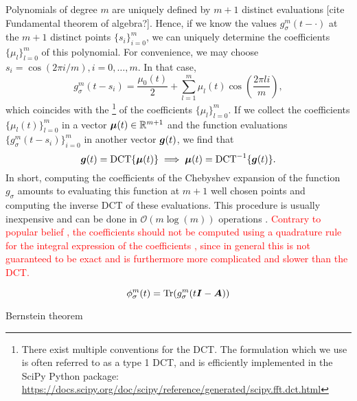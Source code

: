 Polynomials of degree $m$ are uniquely defined by $m+1$ distinct evaluations [cite Fundamental theorem of algebra?].
Hence, if we know the values $g_{\sigma}^m(t - \cdot)$ at the $m+1$ distinct points 
$\{s_i\}_{i=0}^m$, we can uniquely determine the coefficients $\{\mu_l\}_{l=0}^m$
of this polynomial. For convenience, we may choose $s_i = \cos(2 \pi i/m), i=0,\dots,m$.
In that case,
\begin{equation}
    g_{\sigma}^m(t - s_i) = \frac{\mu_0(t)}{2} + \sum_{l=1}^{m} \mu_l(t) \cos\left(\frac{2 \pi l i}{m}\right),
    \label{equ:2-chebyshev-chebyshev-nodes-evaluation}
\end{equation}
which coincides with the \footnote{There exist multiple conventions for the DCT.
The formulation which we use is often referred to as a type 1 DCT,
and is efficiently implemented in the SciPy Python package:
\url{https://docs.scipy.org/doc/scipy/reference/generated/scipy.fft.dct.html}} of the coefficients $\{\mu_l\}_{l=0}^m$.
If we collect the coefficients $\{\mu_l(t)\}_{l=0}^{m}$ in a vector $\boldsymbol{\mu}(t) \in \mathbb{R}^{m+1}$ 
and the function evaluations $\{g_{\sigma}^m(t - s_i)\}_{i=0}^{m}$ in another
vector $\boldsymbol{g}(t)$, we find that
\begin{equation}
    \boldsymbol{g}(t) = \operatorname{DCT} \{ \boldsymbol{\mu}(t) \} \implies \boldsymbol{\mu}(t) = \operatorname{DCT}^{-1}\{ \boldsymbol{g}(t) \}.
    \label{equ:2-chebyshev-chebyshev-DCT}
\end{equation}
In short, computing the coefficients of the Chebyshev expansion 
of the function $g_{\sigma}$ amounts to evaluating this function at $m+1$ well
chosen points and computing the inverse \gls{DCT} of these evaluations. 
This procedure is usually inexpensive and can be done in $\mathcal{O}(m \log(m))$
operations \cite{makhoul1980fct}.
\textcolor{red}{Contrary to popular belief \cite[Algorithm~1]{lin2017randomized},
the coefficients should not be computed using a quadrature rule for the integral
expression of the coefficients \cite[Theorem~3.1]{trefethen2019chebyshev}, since
in general this is not guaranteed to be exact and is furthermore more complicated
and slower than the \gls{DCT}.}

\begin{equation}
    \phi_{\sigma}^m(t) = \operatorname{Tr}(g_{\sigma}^m(t\boldsymbol{I} - \boldsymbol{A}))
    \label{equ:2-chebyshev-DGC-spectral-density-chebyshev-expansion}
\end{equation}

Bernstein theorem \cite[Theorem~73]{meinardus1967approximation} 

